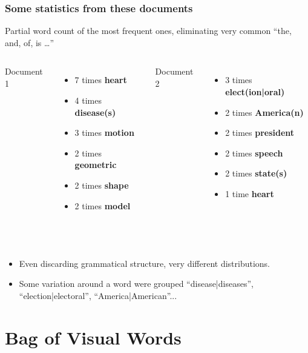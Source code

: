 \documentclass[10pt]{beamer}
\begin{document}
\begin{frame}
  \frametitle{Some statistics from these documents}
  Partial word count of the most frequent ones, eliminating very common ``the, and, of, is \dots''
  \vspace{-3mm}
  \begin{columns}
    \begin{center}
      Document 1
    \end{center}
    \vspace{-5mm}
    \begin{itemize}
    \item 7 times \textbf{heart}
    \item 4 times \textbf{disease(s)}
    \item 3 times \textbf{motion}
    \item 2 times \textbf{geometric}
    \item 2 times \textbf{shape}
    \item 2 times \textbf{model}
    \end{itemize}
    \begin{center}
      Document 2
    \end{center} 
    \vspace{-5mm}
    \begin{itemize}
    \item 3 times \textbf{elect(ion|oral)}
    \item 2 times \textbf{America(n)}
    \item 2 times \textbf{president}
    \item 2 times \textbf{speech}
    \item 2 times \textbf{state(s)}
    \item 1 time \textbf{heart}
    \end{itemize}
  \end{columns}
  ~\\
  \begin{itemize}
  \item Even discarding  grammatical structure, very different distributions.
  \item Some variation around a word were grouped ``disease|diseases'', ``election|electoral'', ``America|American''...
  \end{itemize}
\end{frame}


\section{Bag of Visual Words}
\label{sec:bovw}
\end{document}
